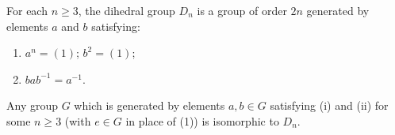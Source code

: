 \begin{theorem}
For each $n \geq 3$, the dihedral group $D_n$ is a group of order $2n$ generated by elements $a$ and $b$ satisfying:
\begin{enumerate}
    \item[(i)] $a^n = (1)$; \quad $b^2 = (1)$;
    \item[(ii)] $bab^{-1} = a^{-1}$.
\end{enumerate}
Any group $G$ which is generated by elements $a,b \in G$ satisfying (i) and (ii) for some $n \geq 3$ (with $e \in G$ in place of (1)) is isomorphic to $D_n$.
\end{theorem}
